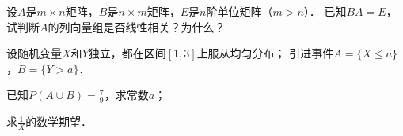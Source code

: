 \documentclass[plain,noanswer,medmath]{../../template/jnuexam}
\begin{document}

\begin{problem}
设$A$是$m \times n$矩阵，$B$是$n \times m$矩阵，$E$是$n$阶单位矩阵（$m > n$）．
已知$BA = E$，试判断$A$的列向量组是否线性相关？为什么？
\end{problem}



\begin{problem}
设随机变量$X$和$Y$独立，都在区间$[1,3]$上服从均匀分布；
引进事件$A = \{X \le a\}$，$B = \{Y > a\}$．\par
\begin{enumerate*}
\item 已知$P(A \cup B) = \frac{7}{9}$，求常数$a$；
\item 求$\frac{1}{X}$的数学期望．
\end{enumerate*}
\end{problem}



\end{document}
